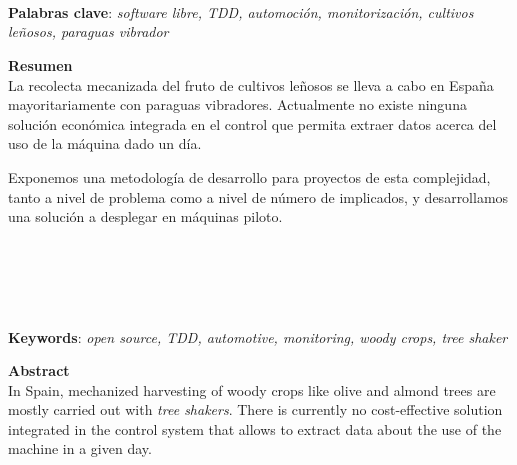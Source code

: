 \thispagestyle{empty}

\begin{center}
{\large\bfseries \titulo \\ \subtitulo }\\
\end{center}
\begin{center}
\titulo \\
\end{center}


\vspace{0.5cm}
\noindent\textbf{Palabras clave}: \textit{software libre, TDD, automoción, monitorización, cultivos leñosos, paraguas vibrador}
\vspace{0.7cm}

\noindent\textbf{Resumen}\\

La recolecta mecanizada del fruto de cultivos leñosos se lleva a cabo en España mayoritariamente
con paraguas vibradores. Actualmente no existe ninguna solución económica integrada en el control
que permita extraer datos acerca del uso de la máquina dado un día.

Exponemos una metodología de desarrollo para proyectos de esta complejidad, tanto a nivel de problema
como a nivel de número de implicados, y desarrollamos una solución a desplegar en máquinas piloto.

\cleardoublepage

\begin{center}
	{\large\bfseries \tituloingles \\ \subtituloingles}\\
\end{center}
\begin{center}
	\autor\\
\end{center}
\vspace{0.5cm}
\noindent\textbf{Keywords}: \textit{open source, TDD, automotive, monitoring, woody crops, tree shaker}
\vspace{0.7cm}

\noindent\textbf{Abstract}\\

In Spain, mechanized harvesting of woody crops like olive and almond trees are mostly carried out with \textit{tree shakers}.
There is currently no cost-effective solution integrated in the control system
that allows to extract data about the use of the machine in a given day.

